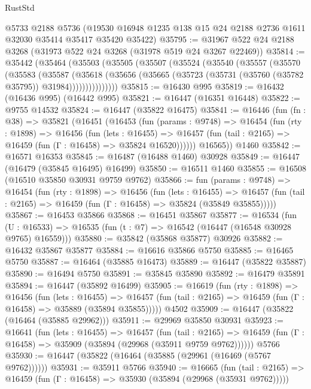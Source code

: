 \begin{lexlean}{RustStd}
\begin{coremodule}
    @5733
    @2188
    @5736
    (@19530 @16948 @1235 @138 @15 @24 @2188 @2736 @1611 @32030 @35414 @35417 @35420 @35422)
@35795 := @31967 @522 @24 @2188 @3268 (@31973 @522 @24 @3268 (@31978 @519 @24 @3267 @22469))
@35814 := @35442
    (@35464
      (@35503
        (@35505
          (@35507
            (@35524
              (@35540
                (@35557
                  (@35570
                    (@35583
                      (@35587
                        (@35618
                          (@35656
                            (@35665 (@35723 (@35731 (@35760 (@35782 @35795)) @31984)))))))))))))))
@35815 := @16430 @995
@35819 := @16432 (@16436 @995) (@16442 @995)
@35821 := @16447 (@16351 @16448)
@35822 := @9755 @14532
@35824 := @16447 (@35822 @16475)
@35841 := @16446
    (fun (fn : @38) =>
    @35821
      (@16451
        (@16453
          (fun (params : @9748) =>
          @16454
            (fun (rty : @1898) =>
            @16456
              (fun (lets : @16455) =>
              @16457 (fun (tail : @2165) => @16459 (fun (Γ : @16458) => @35824 @16520))))))
        @16565))
    @1460
@35842 := @16571 @16353
@35845 := @16487 (@16488 @1460) @30928
@35849 := @16447 (@16479 (@35845 @16495) @16499)
@35850 := @16511 @1460
@35855 := @16508 (@16510 @35850 @30931 @9759 @9762)
@35866 := fun (params : @9748) =>
  @16454
    (fun (rty : @1898) =>
    @16456
      (fun (lets : @16455) =>
      @16457 (fun (tail : @2165) => @16459 (fun (Γ : @16458) => @35824 (@35849 @35855)))))
@35867 := @16453 @35866
@35868 := @16451 @35867
@35877 := @16534
    (fun (U : @16533) => @16535 (fun (t : @7) => @16542 (@16447 (@16548 @30928 @9765) @16559)))
@35880 := @35842 (@35868 @35877) @30926
@35882 := @16432 @35867 @35877
@35884 := @16616 @35866 @5750
@35885 := @16465 @5750
@35887 := @16464 (@35885 @16473)
@35889 := @16447 (@35822 @35887)
@35890 := @16494 @5750
@35891 := @35845 @35890
@35892 := @16479 @35891
@35894 := @16447 (@35892 @16499)
@35905 := @16619
    (fun (rty : @1898) =>
    @16456
      (fun (lets : @16455) =>
      @16457 (fun (tail : @2165) => @16459 (fun (Γ : @16458) => @35889 (@35894 @35855)))))
    @4502
@35909 := @16447 (@35822 (@16464 (@35885 @29962)))
@35911 := @29969 @35850 @30931
@35923 := @16641
    (fun (lets : @16455) =>
    @16457
      (fun (tail : @2165) =>
      @16459 (fun (Γ : @16458) => @35909 (@35894 (@29968 (@35911 @9759 @9762))))))
    @5766
@35930 := @16447 (@35822 (@16464 (@35885 (@29961 (@16469 (@5767 @9762))))))
@35931 := @35911 @5766
@35940 := @16665
    (fun (tail : @2165) => @16459 (fun (Γ : @16458) => @35930 (@35894 (@29968 (@35931 @9762)))))

\end{coremodule}
\end{lexlean}
